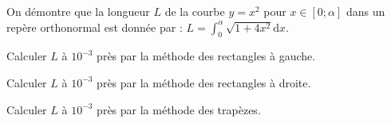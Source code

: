 On démontre que la longueur $L$ de la courbe $y=x^2$ pour $x\in[0;\alpha]$ dans un repère orthonormal est donnée par :
$L=\int_0^\alpha\sqrt{1+4x^2}\text{d}x$.

\question{} Calculer $L$ à $10^{-3}$ près par la méthode des rectangles à gauche.

\question{} Calculer $L$ à $10^{-3}$ près par la méthode des rectangles à droite.

\question{} Calculer $L$ à $10^{-3}$ près par la méthode des trapèzes.